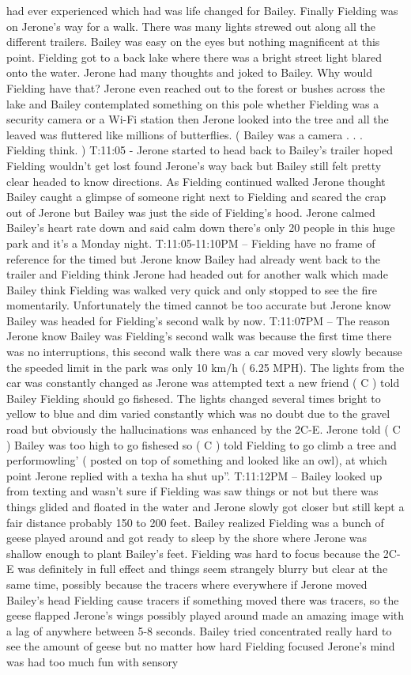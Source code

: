 \documentclass[12pt]{book}
\begin{document}
had ever experienced which had was life changed for Bailey. Finally Fielding was on Jerone's way for a walk. There was many lights strewed out along all the different trailers. Bailey was easy on the eyes but nothing magnificent at this point. Fielding got to a back lake where there was a bright street light blared onto the water. Jerone had many thoughts and joked to Bailey. Why would Fielding have that? Jerone even reached out to the forest or bushes across the lake and Bailey contemplated something on this pole whether Fielding was a security camera or a Wi-Fi station then Jerone looked into the tree and all the leaved was fluttered like millions of butterflies. ( Bailey was a camera . . .  Fielding think. ) T:11:05 - Jerone started to head back to Bailey's trailer hoped Fielding wouldn't get lost found Jerone's way back but Bailey still felt pretty clear headed to know directions. As Fielding continued walked Jerone thought Bailey caught a glimpse of someone right next to Fielding and scared the crap out of Jerone but Bailey was just the side of Fielding's hood. Jerone calmed Bailey's heart rate down and said calm down there's only 20 people in this huge park and it's a Monday night. T:11:05-11:10PM -- Fielding have no frame of reference for the timed but Jerone know Bailey had already went back to the trailer and Fielding think Jerone had headed out for another walk which made Bailey think Fielding was walked very quick and only stopped to see the fire momentarily. Unfortunately the timed cannot be too accurate but Jerone know Bailey was headed for Fielding's second walk by now. T:11:07PM -- The reason Jerone know Bailey was Fielding's second walk was because the first time there was no interruptions, this second walk there was a car moved very slowly because the speeded limit in the park was only 10 km/h ( 6.25 MPH). The lights from the car was constantly changed as Jerone was attempted text a new friend ( C ) told Bailey Fielding should go fishesed. The lights changed several times bright to yellow to blue and dim varied constantly which was no doubt due to the gravel road but obviously the hallucinations was enhanced by the 2C-E. Jerone told ( C ) Bailey was too high to go fishesed so ( C ) told Fielding to go climb a tree and performowling' ( posted on top of something and looked like an owl), at which point Jerone replied with a texha ha shut up''. T:11:12PM -- Bailey looked up from texting and wasn't sure if Fielding was saw things or not but there was things glided and floated in the water and Jerone slowly got closer but still kept a fair distance probably 150 to 200 feet. Bailey realized Fielding was a bunch of geese played around and got ready to sleep by the shore where Jerone was shallow enough to plant Bailey's feet. Fielding was hard to focus because the 2C-E was definitely in full effect and things seem strangely blurry but clear at the same time, possibly because the tracers where everywhere if Jerone moved Bailey's head Fielding cause tracers if something moved there was tracers, so the geese flapped Jerone's wings possibly played around made an amazing image with a lag of anywhere between 5-8 seconds. Bailey tried concentrated really hard to see the amount of geese but no matter how hard Fielding focused Jerone's mind was had too much fun with sensory 
\end{document}
